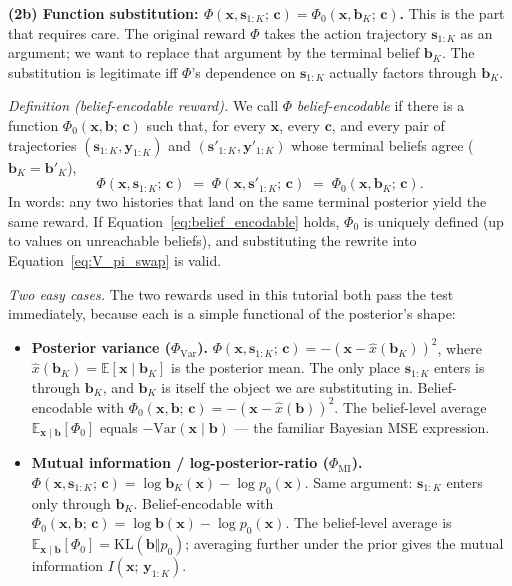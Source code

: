 \documentclass[11pt]{article}
\newcommand{\bc}{\bm{c}}
\newcommand{\bx}{\bm{x}}
\newcommand{\by}{\bm{y}}
\newcommand{\bs}{\bm{s}}
\newcommand{\bb}{\bm{b}}
\newcommand{\E}{\mathbb{E}}
\begin{document}
\textbf{(2b) Function substitution: $\Phi(\bx, \bs_{1:K};\, \bc) = \Phi_0(\bx, \bb_K;\, \bc)$.}  This is the part that requires care.  The original reward $\Phi$ takes the action trajectory $\bs_{1:K}$ as an argument; we want to replace that argument by the terminal belief $\bb_K$.  The substitution is legitimate iff $\Phi$'s dependence on $\bs_{1:K}$ actually factors through $\bb_K$.

\emph{Definition (belief-encodable reward).}  We call $\Phi$ \emph{belief-encodable} if there is a function $\Phi_0(\bx, \bb;\, \bc)$ such that, for every $\bx$, every $\bc$, and every pair of trajectories $(\bs_{1:K}, \by_{1:K})$ and $(\bs'_{1:K}, \by'_{1:K})$ whose terminal beliefs agree ($\bb_K = \bb'_K$),
\begin{equation}
\Phi(\bx, \bs_{1:K};\, \bc) \;=\; \Phi(\bx, \bs'_{1:K};\, \bc) \;=\; \Phi_0(\bx, \bb_K;\, \bc).
\label{eq:belief_encodable}
\end{equation}
In words: any two histories that land on the same terminal posterior yield the same reward.  If Equation~\eqref{eq:belief_encodable} holds, $\Phi_0$ is uniquely defined (up to values on unreachable beliefs), and substituting the rewrite into Equation~\eqref{eq:V_pi_swap} is valid.

\emph{Two easy cases.}  The two rewards used in this tutorial both pass the test immediately, because each is a simple functional of the posterior's shape:

\begin{itemize}[nosep, leftmargin=*]
\item \textbf{Posterior variance ($\Phi_{\text{Var}}$).}  $\Phi(\bx, \bs_{1:K};\, \bc) = -(\bx - \hat{x}(\bb_K))^2$, where $\hat{x}(\bb_K) = \E[\bx \mid \bb_K]$ is the posterior mean.  The only place $\bs_{1:K}$ enters is through $\bb_K$, and $\bb_K$ is itself the object we are substituting in.  Belief-encodable with $\Phi_0(\bx, \bb;\, \bc) = -(\bx - \hat{x}(\bb))^2$.  The belief-level average $\E_{\bx \mid \bb}[\Phi_0]$ equals $-\mathrm{Var}(\bx \mid \bb)$ --- the familiar Bayesian MSE expression.
\item \textbf{Mutual information / log-posterior-ratio ($\Phi_{\text{MI}}$).}  $\Phi(\bx, \bs_{1:K};\, \bc) = \log \bb_K(\bx) - \log p_0(\bx)$.  Same argument: $\bs_{1:K}$ enters only through $\bb_K$.  Belief-encodable with $\Phi_0(\bx, \bb;\, \bc) = \log \bb(\bx) - \log p_0(\bx)$.  The belief-level average is $\E_{\bx \mid \bb}[\Phi_0] = \mathrm{KL}(\bb \Vert p_0)$; averaging further under the prior gives the mutual information $I(\bx;\, \by_{1:K})$.
\end{itemize}
\end{document}
